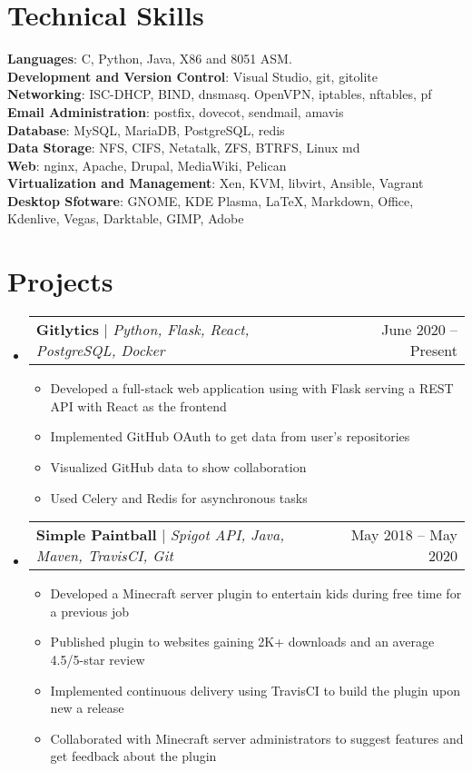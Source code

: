 \documentclass[letterpaper,11pt]{article}
\makeatletter
\newcommand{\resumeItem}[1]{
  \item\small{
    {#1 \vspace{-2pt}}
  }
}
\newcommand{\resumeProjectHeading}[2]{
    \item
    \begin{tabular*}{0.97\textwidth}{l@{\extracolsep{\fill}}r}
      \small#1 & #2 \\
    \end{tabular*}\vspace{-7pt}
}
\newcommand{\resumeSubHeadingListStart}{\begin{itemize}[leftmargin=0.15in, label={}]}
\newcommand{\resumeSubHeadingListEnd}{\end{itemize}}
\newcommand{\resumeItemListStart}{\begin{itemize}}
\newcommand{\resumeItemListEnd}{\end{itemize}\vspace{-5pt}}
\makeatother
\begin{document}
\section{Technical Skills}
 \begin{itemize}[leftmargin=0.15in, label={}]
    \small{\item{
     \textbf{Languages}{: C, Python, Java, X86 and 8051 ASM.} \\
     \textbf{Development and Version Control}{:  Visual Studio, git, gitolite} \\
     \textbf{Networking}{: ISC-DHCP, BIND, dnsmasq. OpenVPN, iptables, nftables, pf} \\
     \textbf{Email Administration}{: postfix, dovecot, sendmail, amavis} \\
     \textbf{Database}{: MySQL, MariaDB, PostgreSQL, redis} \\
     \textbf{Data Storage}{: NFS, CIFS, Netatalk, ZFS, BTRFS, Linux md} \\
     \textbf{Web}{: nginx, Apache, Drupal, MediaWiki, Pelican} \\
     \textbf{Virtualization and Management}{: Xen, KVM, libvirt, Ansible, Vagrant  } \\
     \textbf{Desktop Sfotware}{: GNOME, KDE Plasma, \LaTeX, Markdown, Office, Kdenlive, Vegas, Darktable, GIMP, Adobe} 
    }}
 \end{itemize}

\section{Projects}
\resumeSubHeadingListStart
\resumeProjectHeading
{\textbf{Gitlytics} $|$ \emph{Python, Flask, React, PostgreSQL, Docker}}{June 2020 -- Present}
\resumeItemListStart
\resumeItem{Developed a full-stack web application using with Flask serving a REST API with React as the frontend}
\resumeItem{Implemented GitHub OAuth to get data from user’s repositories}
\resumeItem{Visualized GitHub data to show collaboration}
\resumeItem{Used Celery and Redis for asynchronous tasks}
\resumeItemListEnd
\resumeProjectHeading
{\textbf{Simple Paintball} $|$ \emph{Spigot API, Java, Maven, TravisCI, Git}}{May 2018 -- May 2020}
\resumeItemListStart
\resumeItem{Developed a Minecraft server plugin to entertain kids during free time for a previous job}
\resumeItem{Published plugin to websites gaining 2K+ downloads and an average 4.5/5-star review}
\resumeItem{Implemented continuous delivery using TravisCI to build the plugin upon new a release}
\resumeItem{Collaborated with Minecraft server administrators to suggest features and get feedback about the plugin}
\resumeItemListEnd
\resumeSubHeadingListEnd



%


\end{document}
